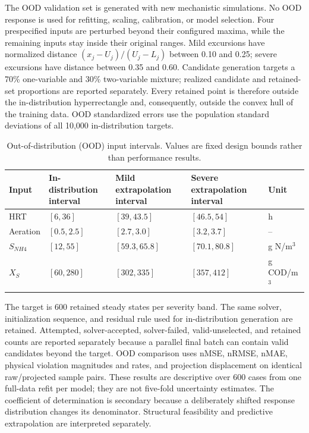 \documentclass[a4paper,fleqn]{cas-sc}
\begin{document}
The OOD validation set is generated with new mechanistic simulations. No OOD response is used for refitting, scaling, calibration, or model selection. Four prespecified inputs are perturbed beyond their configured maxima, while the remaining inputs stay inside their original ranges. Mild excursions have normalized distance $(x_j-U_j)/(U_j-L_j)$ between 0.10 and 0.25; severe excursions have distance between 0.35 and 0.60. Candidate generation targets a 70\% one-variable and 30\% two-variable mixture; realized candidate and retained-set proportions are reported separately. Every retained point is therefore outside the in-distribution hyperrectangle and, consequently, outside the convex hull of the training data. OOD standardized errors use the population standard deviations of all 10,000 in-distribution targets.

\begin{table}[htbp]
\centering
\caption{Out-of-distribution (OOD) input intervals. Values are fixed design bounds rather than performance results.}
\label{tab:ood_domain}
\scriptsize
\begin{tabular}{lllll}
\toprule
Input & In-distribution interval & Mild extrapolation interval & Severe extrapolation interval & Unit \\
\midrule
HRT & $[6,36]$ & $[39,43.5]$ & $[46.5,54]$ & h \\
Aeration & $[0.5,2.5]$ & $[2.7,3.0]$ & $[3.2,3.7]$ & -- \\
$S_{NH4}$ & $[12,55]$ & $[59.3,65.8]$ & $[70.1,80.8]$ & g N/m$^3$ \\
$X_S$ & $[60,280]$ & $[302,335]$ & $[357,412]$ & g COD/m$^3$ \\
\bottomrule
\end{tabular}
\end{table}

The target is 600 retained steady states per severity band. The same solver, initialization sequence, and residual rule used for in-distribution generation are retained. Attempted, solver-accepted, solver-failed, valid-unselected, and retained counts are reported separately because a parallel final batch can contain valid candidates beyond the target. OOD comparison uses nMSE, nRMSE, nMAE, physical violation magnitudes and rates, and projection displacement on identical raw/projected sample pairs. These results are descriptive over 600 cases from one full-data refit per model; they are not five-fold uncertainty estimates. The coefficient of determination is secondary because a deliberately shifted response distribution changes its denominator. Structural feasibility and predictive extrapolation are interpreted separately.
\end{document}
